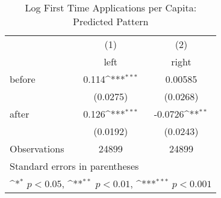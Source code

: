 \begin{table}[htbp]\centering
\def\sym#1{\ifmmode^{#1}\else\(^{#1}\)\fi}
\caption{Log First Time Applications per Capita: Predicted Pattern}
\begin{tabular}{l*{2}{c}}
\hline\hline
                    &\multicolumn{1}{c}{(1)}&\multicolumn{1}{c}{(2)}\\
                    &\multicolumn{1}{c}{left}&\multicolumn{1}{c}{right}\\
\hline
before              &       0.114\sym{***}&     0.00585         \\
                    &    (0.0275)         &    (0.0268)         \\
[1em]
after               &       0.126\sym{***}&     -0.0726\sym{**} \\
                    &    (0.0192)         &    (0.0243)         \\
\hline
Observations        &       24899         &       24899         \\
\hline\hline
\multicolumn{3}{l}{\footnotesize Standard errors in parentheses}\\
\multicolumn{3}{l}{\footnotesize \sym{*} \(p<0.05\), \sym{**} \(p<0.01\), \sym{***} \(p<0.001\)}\\
\end{tabular}
\end{table}
